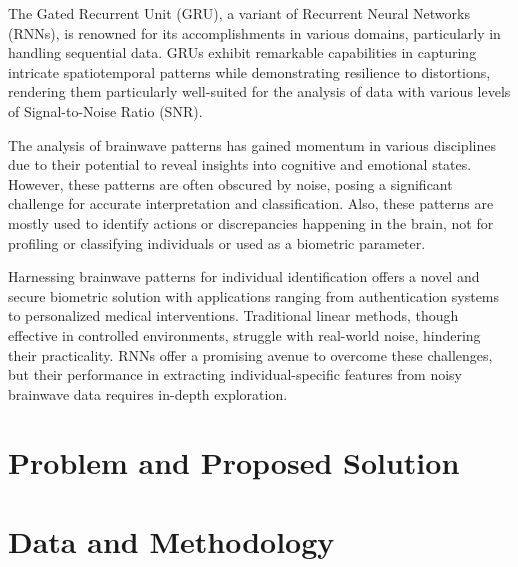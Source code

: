 \documentclass[11pt, a4paper, oneside]{assets/tex/thesis} %
\begin{document}
{The Gated Recurrent Unit (GRU), a variant of Recurrent Neural Networks (RNNs), is renowned for its accomplishments in various domains, particularly in handling sequential data. GRUs exhibit remarkable capabilities in capturing intricate spatiotemporal patterns while demonstrating resilience to distortions, rendering them particularly well-suited for the analysis of data with various levels of Signal-to-Noise Ratio (SNR). 

The analysis of brainwave patterns has gained momentum in various disciplines due to their potential to reveal insights into cognitive and emotional states\cite{Proceedings:Age_and_Gender_Classification_Using_EEG_Paralinguistic_Features}. However, these patterns are often obscured by noise, posing a significant challenge for accurate interpretation and classification\cite{Proceedings:Deep_Learning_for_EEG-Based_Preference_Classification}. Also, these patterns are mostly used to identify actions or discrepancies happening in the brain\cite{Proceedings:Gender_Clasification_Based_on_Single_Channel_EEG_Signal}, not for profiling or classifying individuals or used as a biometric parameter.

Harnessing brainwave patterns for individual identification offers a novel and secure biometric solution with applications ranging from authentication systems to personalized medical interventions\cite{Proceedings:EEG_biometric_identification:_a_thorough_exploration_of_the_time-frequency_domain}. Traditional linear methods, though effective in controlled environments, struggle with real-world noise, hindering their practicality\cite{Proceedings:Gender_Clasification_Based_on_Single_Channel_EEG_Signal}. RNNs offer a promising avenue to overcome these challenges, but their performance in extracting individual-specific features from noisy brainwave data requires in-depth exploration\cite{Proceedings:Deep_Learning_for_EEG-Based_Preference_Classification}.


\chapter{Problem and Proposed Solution}
\label{Ch2}

\chapter{Data and Methodology}
\label{Ch3}

}
\end{document}
